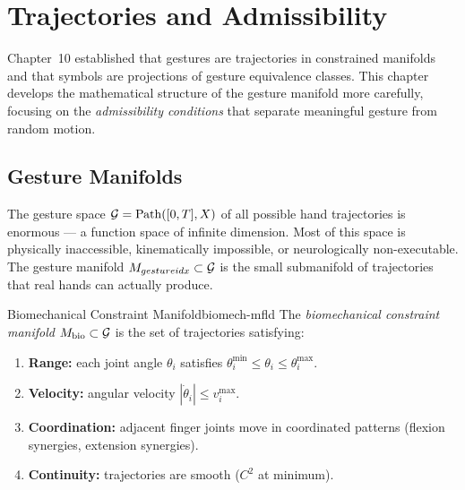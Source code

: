
\chapter{Trajectories and Admissibility}



Chapter~10 established that gestures are trajectories in constrained
manifolds and that symbols are projections of gesture equivalence classes.
This chapter develops the mathematical structure of the gesture manifold
more carefully, focusing on the \emph{admissibility conditions} that
separate meaningful gesture from random motion.

\section{Gesture Manifolds}

The gesture space $\mathcal{G} = \mathrm{Path}([0,T], X)$ of all possible
hand trajectories is enormous — a function space of infinite dimension.
Most of this space is physically inaccessible, kinematically impossible,
or neurologically non-executable. The gesture manifold $M_{gestureidx} \subset
\mathcal{G}$ is the small submanifold of trajectories that real hands can
actually produce.

\begin{definition}{Biomechanical Constraint Manifold}{biomech-mfld}
  The \emph{biomechanical constraint manifold} $M_\text{bio} \subset
  \mathcal{G}$ is the set of trajectories satisfying:
  \begin{enumerate}
    \item \textbf{Range:} each joint angle $\theta_i$ satisfies
          $\theta_i^{\min} \leq \theta_i \leq \theta_i^{\max}$.
    \item \textbf{Velocity:} angular velocity $|\dot{\theta}_i| \leq v_i^{\max}$.
    \item \textbf{Coordination:} adjacent finger joints move in
          coordinated patterns (flexion synergies, extension synergies).
    \item \textbf{Continuity:} trajectories are smooth ($C^2$ at minimum).
  \end{enumerate}
\end{definition}


